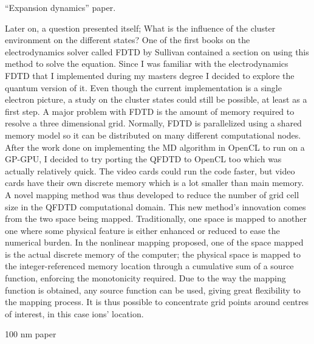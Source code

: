 ``Expansion dynamics'' paper.

Later on, a question presented itself; What is the influence of the cluster
environment on the different states? One of the first books on the
electrodynamics solver called FDTD by Sullivan contained a section on using
this method to solve the \schrodinger equation. Since I was familiar with
the electrodynamics FDTD that I implemented during my masters degree I decided
to explore the quantum version of it. Even though the current implementation is
a single electron picture, a study on the cluster states could still be possible,
at least as a first step. A major problem with FDTD is the amount of memory
required to resolve a three dimensional grid. Normally, FDTD is parallelized
using a shared memory model so it can be distributed on many different
computational nodes. After the work done on implementing the MD algorithm in
OpenCL to run on a GP-GPU, I decided to try porting the QFDTD to OpenCL too
which was actually relatively quick. The video cards could run the code faster,
but video cards have their own discrete memory which is a lot smaller than main
memory. A novel mapping method was thus developed to reduce the number of grid
cell size in the QFDTD computational domain. This new method's innovation comes
from the two space being mapped. Traditionally, one space is mapped to another
one where some physical feature is either enhanced or reduced to ease the numerical
burden. In the nonlinear mapping proposed, one of the space mapped is the actual
discrete memory of the computer; the physical space is mapped to the
integer-referenced memory location through a cumulative sum of a source function,
enforcing the monotonicity required. Due to the way the mapping function is
obtained, any source function can be used, giving great flexibility to the
mapping process. It is thus possible to concentrate grid points around centres
of interest, in this case ions' location.







100 nm paper

